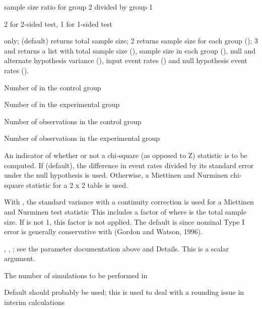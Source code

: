 \begin{Arguments}
\begin{ldescription}
\item[\code{ratio}] sample size ratio for group 2 divided by group 1
\item[\code{sided}] 2 for 2-sided test, 1 for 1-sided test
\item[\code{outtype}]  only; (default) returns total sample size; 2 returns sample size for each group ();
3 and  returns a list with total sample size (), sample size in each group (),
null and alternate hypothesis variance (), input event rates () and null hypothesis event
rates (). 

\item[\code{x1}] Number of  in the control group
\item[\code{x2}] Number of  in the experimental group
\item[\code{n1}] Number of observations in the control group
\item[\code{n2}] Number of observations in the experimental group
\item[\code{chisq}] An indicator of whether or not a chi-square (as opposed to Z) statistic is to be computed.
If  (default), the difference in event rates divided by its standard error under the null hypothesis is used. 
Otherwise, a Miettinen and Nurminen chi-square statistic for a 2 x 2 table is used.
\item[\code{adj}] With , the standard variance with a continuity correction is used for a Miettinen and Nurminen test statistic 
This includes a factor of  where  is the total sample size. If  is not 1, 
this factor is not applied. The default is  since nominal Type I error is generally conservative with 
(Gordon and Watson, 1996).
\item[\code{scale}] , , ; see the  parameter documentation above and Details. 
This is a scalar argument.
\item[\code{nsim}] The number of simulations to be performed in 
\item[\code{tol}] Default should probably be used; this is used to deal with a rounding issue in interim calculations
\end{ldescription}
\end{Arguments}

